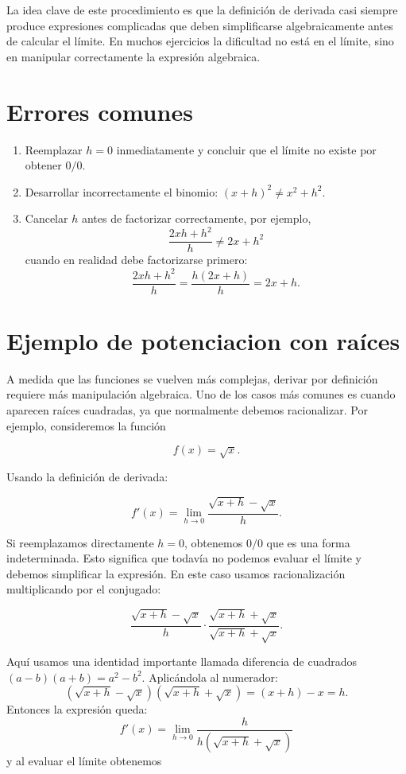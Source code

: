\documentclass{article}
\begin{document}
La idea clave de este procedimiento es que la definición de derivada casi siempre produce expresiones complicadas que deben simplificarse algebraicamente antes de calcular el límite. En muchos ejercicios la dificultad no está en el límite, sino en manipular correctamente la expresión algebraica.

\section*{Errores comunes}
\begin{enumerate}
    \item Reemplazar \(h=0\) inmediatamente y concluir que el límite no existe por obtener \(0/0\).
    
    \item Desarrollar incorrectamente el binomio: $(x+h)^2\neq x^2+h^2$.
    
    \item Cancelar \(h\) antes de factorizar correctamente, por ejemplo,
    \[
    \frac{2xh+h^2}{h} \neq 2x+h^2\]
cuando en realidad debe factorizarse primero:
\[
\frac{2xh+h^2}{h}
=
\frac{h(2x+h)}{h}
=
2x+h.
\]
    \end{enumerate}
\section*{Ejemplo de potenciacion con raíces}

A medida que las funciones se vuelven más complejas, derivar por definición requiere más manipulación algebraica. Uno de los casos más comunes es cuando aparecen raíces cuadradas, ya que normalmente debemos racionalizar. Por ejemplo, consideremos la función

\[
f(x)=\sqrt{x}.
\]

Usando la definición de derivada:

\[
f'(x)=\lim_{h\to0}\frac{\sqrt{x+h}-\sqrt{x}}{h}.
\]

Si reemplazamos directamente \(h=0\), obtenemos $0/0$
que es una forma indeterminada. Esto significa que todavía no podemos evaluar el límite y debemos simplificar la expresión.
En este caso usamos racionalización multiplicando por el conjugado:

\[
\frac{\sqrt{x+h}-\sqrt{x}}{h}
\cdot
\frac{\sqrt{x+h}+\sqrt{x}}{\sqrt{x+h}+\sqrt{x}}.
\]

Aquí usamos una identidad importante llamada diferencia de cuadrados
    $(a-b)(a+b)=a^2-b^2$. Aplicándola al numerador:
\[
(\sqrt{x+h}-\sqrt{x})(\sqrt{x+h}+\sqrt{x})
=(x+h)-x=h.
\]
Entonces la expresión queda:
\[
f'(x)=\lim_{h\to0}
\frac{h}{h(\sqrt{x+h}+\sqrt{x})}
\]
y al evaluar el límite obtenemos
\end{document}
